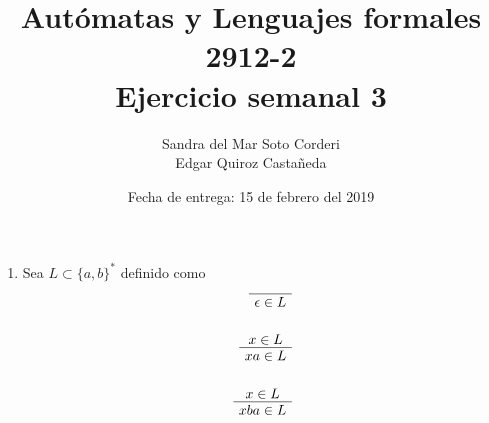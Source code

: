 \documentclass{article}
\begin{document}
    \title{Autómatas y Lenguajes formales \\
    \large 2912-2 \\
    \large Ejercicio semanal 3}

    \date{Fecha de entrega: 15 de febrero del 2019}

    \author{Sandra del Mar Soto Corderi \\
            Edgar Quiroz Castañeda}  
    \maketitle
    
    \begin{enumerate}
        \item {
            Sea $L \subset \{a, b\}^*$ definido como 
            \begin{align*}
                \AxiomC{}
                \UnaryInfC{$\epsilon \in L$}
                \DisplayProof \\
                \\
                \AxiomC{$x \in L $}
                \UnaryInfC{$xa \in L$}
                \DisplayProof \\
                \\
                \AxiomC{$x \in L $}
                \UnaryInfC{$xba \in L$}
                \DisplayProof \\
            \end{align*}

}
\end{enumerate}
\end{document}
